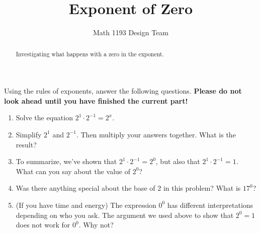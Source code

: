 \documentclass[noauthor]{ximera}
\title{Exponent of Zero}
\author{Math 1193 Design Team}
\begin{document}
\begin{abstract}
    Investigating what happens with a zero in the exponent.
\end{abstract}
\maketitle

Using the rules of exponents, answer the following questions.
\textbf{Please do not look ahead until you have finished the current part!}

\begin{enumerate}
    \item Solve the equation \(2^1 \cdot 2^{-1} = 2^x\).
    \item Simplify \(2^1\) and \(2^{-1}\). Then multiply your answers together.
    What is the result?
    \item To summarize, we've shown that \(2^1 \cdot 2^{-1} = 2^0\), but
    also that \(2^1 \cdot 2^{-1} = 1\). What can you say about the value
    of \(2^0\)?
    \item Was there anything special about the base of 2 in this
    problem? What is \(17^0\)?
    \item (If you have time and energy) The expression \(0^0\) has 
    different interpretations depending on who you ask. The argument
    we used above to show that \(2^0 = 1\) does not work for \(0^0\).
    Why not?
\end{enumerate}
\end{document}
